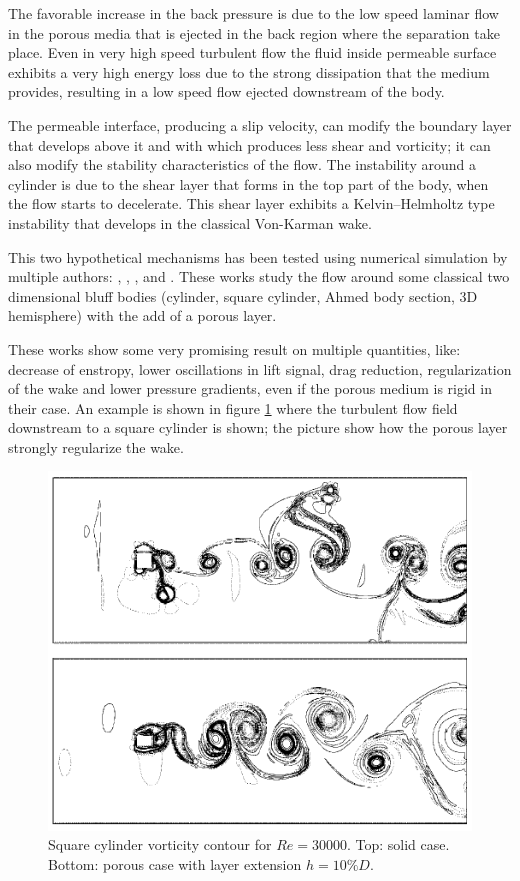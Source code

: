 The favorable increase in the back pressure is due to the low speed laminar flow in the porous media that is ejected in the back region where the separation take place.
Even in very high speed turbulent flow the fluid inside permeable surface exhibits a very high energy loss due to the strong dissipation that the medium provides, resulting in a low speed flow ejected downstream of the body.

The permeable interface, producing a slip velocity, can modify the boundary layer that develops above it and with which produces less shear and vorticity; it can also modify the stability characteristics of the flow.
The instability around a cylinder is due to the shear layer that forms in the top part of the body, when the flow starts to decelerate.
This shear layer exhibits a Kelvin–Helmholtz type instability that develops in the classical Von-Karman wake.

This two hypothetical mechanisms has been tested using numerical simulation by multiple authors: \citet{bruneau2004passive}, \citet{bruneau2008numerical}, \citet{bhattacharyya2011reduction}, \citet{naito2012numerical} and \citet{mimeau2017passive}.
These works study the flow around some classical two dimensional bluff bodies (cylinder, square cylinder, Ahmed body section, 3D hemisphere) with the add of a porous layer.

These works show some very promising result on multiple quantities, like: decrease of enstropy, lower oscillations in lift signal, drag reduction, regularization of the wake and lower pressure gradients, even if the porous medium is rigid in their case.
An example is shown in figure \ref{fig:porous_cylinder} where the turbulent flow field downstream to a square cylinder is shown; the picture show how the porous layer strongly regularize the wake.

\begin{figure}[h]
	\centering
	\includegraphics[width=0.7\linewidth]{chapter_1/cylinder_porous}
	\caption{Square cylinder vorticity contour for $Re=30000$. Top: solid case. Bottom: porous case with layer extension $h=10\% D$.}
	\label{fig:porous_cylinder}
\end{figure}


